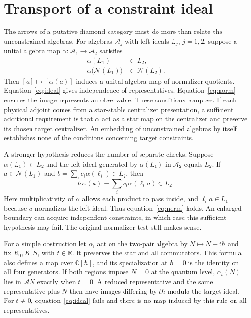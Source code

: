 \documentclass[11pt,letterpaper]{article}
\newcommand{\cA}{\mathcal A}
\newcommand{\cN}{\mathcal N}
\newcommand{\CC}{\mathbb C}
\newcommand{\RR}{\mathbb R}
\begin{document}
\section{Transport of a constraint ideal}
\label{sec:transport}
The arrows of a putative diamond category must do more than relate the unconstrained algebras.
For algebras $\cA_j$ with left ideals $L_j$, $j=1,2$, suppose a unital algebra map
$\alpha:\cA_1\to\cA_2$ satisfies
\begin{align}
 \alpha(L_1)&\subset L_2, \label{eq:ideal}\\
 \alpha\bigl(\cN(L_1)\bigr)&\subset\cN(L_2). \label{eq:norm}
\end{align}
Then $[a]\mapsto[\alpha(a)]$ induces a unital algebra map of normalizer quotients.
Equation~\eqref{eq:ideal} gives independence of representatives. Equation~\eqref{eq:norm}
ensures the image represents an observable. These conditions compose. If each physical adjoint
comes from a star-stable centralizer presentation, a sufficient additional requirement is that
$\alpha$ act as a star map on the centralizer and preserve its chosen target centralizer. An
embedding of unconstrained algebras by itself establishes none of the conditions concerning
target constraints.

A stronger hypothesis reduces the number of separate checks. Suppose $\alpha(L_1)\subset L_2$
and the left ideal generated by $\alpha(L_1)$ in $\cA_2$ equals $L_2$. If $a\in\cN(L_1)$ and
$b=\sum_i c_i\alpha(\ell_i)\in L_2$, then
\[
 b\,\alpha(a)=\sum_i c_i\alpha(\ell_i a)\in L_2 .
\]
Here multiplicativity of $\alpha$ allows each product to pass inside, and $\ell_i a\in L_1$
because $a$ normalizes the left ideal. Thus equation~\eqref{eq:norm} holds. An enlarged boundary can acquire independent constraints,
in which case this sufficient hypothesis may fail. The original normalizer test still makes
sense.

For a simple obstruction let $\alpha_t$ act on the two-pair algebra by $N\mapsto N+t\hbar$ and
fix $R_0,K,S$, with $t\in\RR$. It preserves the star and all commutators. This formula also
defines a map over $\CC[\hbar]$, and its specialization at $\hbar=0$ is the identity on all
four generators. If both regions impose $N=0$ at the quantum level, $\alpha_t(N)$ lies in $\cA
N$ exactly when $t=0$. A reduced representative and the same representative plus $N$ then have
images differing by $t\hbar$ modulo the target ideal. For $t\ne0$, equation~\eqref{eq:ideal}
fails and there is no map induced by this rule on all representatives.
\end{document}
